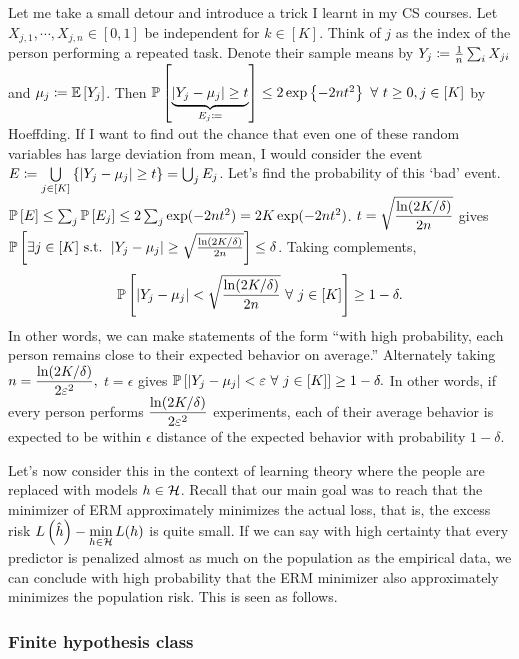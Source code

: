 Let me take a small detour and introduce a trick I learnt in my CS courses. Let $X_{j,1},\cdots, X_{j,n}\in [0,1]$ be independent for $k\in [K]$. Think of $j$ as the index of the person performing a repeated task. Denote their sample means by $Y_{j}\sett \frac{1}{n}\sum_{i}X_{ji}$ and $\mu_{j}\sett \E{Y_{j}}$. Then $\P{\underbrace{\abs{Y_{j}-\mu_{j}} \ge t}_{E_{j}\sett}} \le 2\exp\set{-2nt^{2}}\fa t\ge 0, j\in[K]$ by Hoeffding. If I want to find out the chance that even one of these random variables has large deviation from mean, I would consider the event $E \sett \bigcup\limits_{j\in[K]}\set{\abs{Y_{j}-\mu_{j}}\ge t} = \bigcup_{j}E_{j}$. Let's find the probability of this `bad' event. $\P{E} \le \sum_{j}\P{E_{j}} \le 2\sum_{j} \exp(-2nt^{2}) = 2K\exp(-2nt^{2})$. $\ds t = \sqrt{\frac{\ln(2K/\delta)}{2n}}$ gives $\P{\exists j\in[K] \text{ s.t. } \abs{Y_{j}-\mu_{j}} \ge \sqrt{\frac{\ln(2K/\delta)}{2n}}} \le \delta$. Taking complements, $$\P{\abs{Y_{j}-\mu_{j}} < \sqrt{\frac{\ln(2K/\delta)}{2n}}\fa j\in[K]} \ge 1-\delta.$$ In other words, we can make statements of the form ``with high probability, each person remains close to their expected behavior on average.'' Alternately taking $\ds n = \frac{\ln(2K/\delta)}{2\epsilon^{2}},$ $t=\epsilon$ gives $\P{\abs{Y_{j}-\mu_{j}} < \epsilon \fa j\in[K]} \ge 1-\delta.$ In other words, if every person performs $\ds \frac{\ln(2K/\delta)}{2\epsilon^{2}}$ experiments, each of their average behavior is expected to be within $\epsilon$ distance of the expected behavior with probability $1-\delta$.

Let's now consider this in the context of learning theory where the people are replaced with models $h\in \cH$. Recall that our main goal was to reach that the minimizer of ERM approximately minimizes the actual loss, that is, the excess risk $\ds L\left(\hat h\right) - \min_{h\in \cH}L(h)$ is quite small. If we can say with high certainty that every predictor is penalized almost as much on the population as the empirical data, we can conclude with high probability that the ERM minimizer also approximately minimizes the population risk. This is seen as follows.

\subsubsection{Finite hypothesis class}

